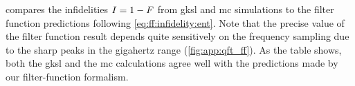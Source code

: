  compares the infidelities $I=1-F$ from \gls{gksl} and \gls{mc} simulations to the filter function predictions following \cref{eq:ff:infidelity:ent}.
Note that the precise value of the filter function result depends quite sensitively on the frequency sampling due to the sharp peaks in the gigahertz range (\cref{fig:app:qft_ff}).
As the table shows, both the \gls{gksl} and the \gls{mc} calculations agree well with the predictions made by our filter-function formalism.